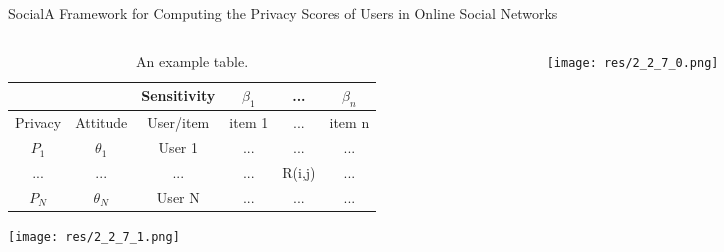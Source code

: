 \begin{frame}{Social}{A Framework for Computing the Privacy Scores of Users in Online Social Networks \cite{liu_framework_2010}}

	\begin{columns}
		\begin{column}{0.7\textwidth}
			\begin{center}
			
				\begin{table}
					\begin{tabular}{c|c|c|c|c|c}
															&								&		Sensitivity	&	$\beta_{1}$	&		...			&	$\beta_{n}$	\\\hline
						 	Privacy					&		Attitude		&	User/item			&	item 1			&			...		&	item n			\\\hline
							$P_{1}$					&$\theta_{1}$		&		User 1			&		...				&		...			&			...			\\\hline
								...						&			...				&			...				&		...				&		R(i,j)	&			...			\\\hline
							$P_{N}$					&$\theta_{N}$		&		User N			&		...				&		...			&			...			
					\end{tabular}
					\caption{\label{tab:Table} An example table.}
				\end{table}
				
				
				\texttt{[image: res/2\_2\_7\_1.png]}
				
			\end{center}
		\end{column}
		
		\begin{column}{0.2\textwidth}
		
			\begin{center}
				\texttt{[image: res/2\_2\_7\_0.png]}
			\end{center}
			
		\end{column}
	\end{columns}
			

\end{frame}

